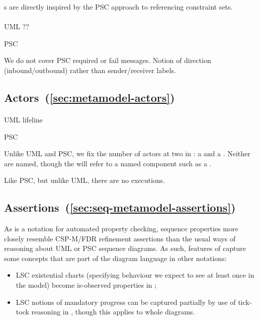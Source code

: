 \mrefmessageset s are directly inspired by the PSC approach to referencing constraint sets.

\paragraph{\mmessagespec}
\begin{featset}
\item[UML] ??
\item[PSC] 
\end{featset}

We do not cover PSC required or fail messages.
Notion of direction (inbound/outbound) rather than sender/receiver labels.

\subsection{Actors~(\ref{sec:metamodel-actors})}

\paragraph{\mactor}
\begin{featset}
\item[UML] lifeline
\item[PSC] 
\end{featset}

Unlike UML and PSC, we fix the number of actors at two
 in \langname: a \mtarget{} and a \mworld{}.
Neither are named, though the \mtarget{} will refer to a
named component such as a \mrcmodule.

Like PSC, but unlike UML, there are no executions.

\subsection{Assertions~(\ref{sec:seq-metamodel-assertions})}

As \langname{} is a notation for automated property checking,
sequence properties more closely resemble CSP-M/FDR refinement
assertions than the usual ways of reasoning about UML or PSC sequence diagrams.  As such,
features of \msequenceproperty{} capture some
concepts that are part of the diagram language 
in other notations:

\begin{itemize}
  \item
    LSC
    existential charts (specifying behaviour we expect to see at least once
    in the model) become is-observed properties in
    \langname;
  \item
    LSC notions of mandatory progress can be
    captured partially by use of tick-tock reasoning
    in \langname, though this applies to whole diagrams.
\end{itemize}

